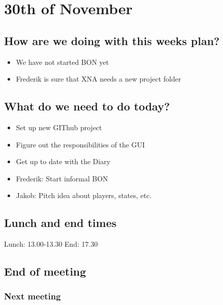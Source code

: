 \section{30th of November}
\subsection{How are we doing with this weeks plan?}
\begin{itemize}
\item  We have not started BON yet
\item Frederik is sure that XNA needs a new project folder
\end{itemize}

\subsection{What do we need to do today?}
\begin{itemize}
\item Set up new GIThub project
\item Figure out the responsibilities of the GUI
\item Get up to date with the Diary
\item Frederik: Start informal BON
\item Jakob: Pitch idea about players, states, etc.
\end{itemize}

\subsection{Lunch and end times}
Lunch:
13.00-13.30
End:
17.30
\subsection{End of meeting}
\subsubsection{Next meeting}

